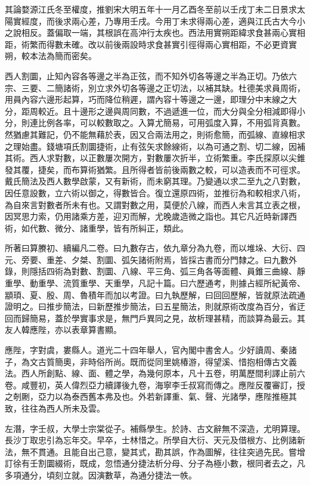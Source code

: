 \begin{pinyinscope}
其論婺源江氏冬至權度，推劉宋大明五年十一月乙酉冬至前以壬戌丁未二日景求太陽實經度，而後求兩心差，乃專用壬戌。今用丁未求得兩心差，適與江氏古大今小之說相反。蓋偏取一端，其根誤在高沖行太疾也。西法用實朔距緯求食甚兩心實相距，術繁而得數未確。改以前後兩設時求食甚實引徑得兩心實相距，不必更資實朔，較本法為簡而密矣。

西人割圜，止知內容各等邊之半為正弦，而不知外切各等邊之半為正切。乃依六宗、三要、二簡諸術，別立求外切各等邊之正切法，以補其缺。杜德美求員周術，用員內容六邊形起算，巧而降位稍遲，謂內容十等邊之一邊，即理分中末線之大分，距周較近。且十邊形之邊與周同數，不過遞進一位，而大分與全分相減即得小分，則連比例各率，可以較數取之。入算尤簡易，可用弧度入算，不用弧背真數。然猶慮其難記，仍不能無藉於表，因又合兩法用之，則術愈簡，而弧線、直線相求之理始盡。錢塘項氏割圜捷術，止有弦矢求餘線術，以為可通之割、切二線，因補其術。西人求對數，以正數屢次開方，對數屢次折半，立術繁重。李氏探原以尖錐發其覆，捷矣，而布算術猶繁。且所得者皆前後兩數之較，可以造表而不可徑求。戴氏簡法及西人數學啟蒙，又有新術，而未窮其理。乃變通以求二至九之八對數，因任意設數，立六術以御之，得數皆合。復立還原四術，並推衍為和較相求八術，為自來言對數者所未有也。又謂對數之用，莫便於八線，而西人未言其立表之根，因冥思力索，仍用諸乘方差，迎刃而解，尤晚歲造微之詣也。其它凡近時新譯西術，如代數、微分、諸重學，皆有所糾正，類此。

所著曰算賸初、續編凡二卷。曰九數存古，依九章分為九卷，而以堆垛、大衍、四元、旁要、重差、夕桀、割圜、弧矢諸術附焉，皆採古書而分門隸之。曰九數外錄，則隱括四術為對數、割圜、八線、平三角、弧三角各等面體、員錐三曲線、靜重學、動重學、流質重學、天重學，凡記十篇。曰六歷通考，則據占經所紀黃帝、顓頊、夏、殷、周、魯積年而加以考證。曰九執歷解，曰回回歷解，皆就原法疏通證明之。曰推步簡法，曰新歷推步簡法，曰五星簡法，則就原術改度為百分，省迂回而歸簡易，蓋於學實事求是，無門戶異同之見，故析理甚精，而談算為最云。其友人韓應陛，亦以表章算書顯。

應陛，字對虞，婁縣人。道光二十四年舉人，官內閣中書舍人。少好讀周、秦諸子，為文古質簡奧，非時俗所尚。既而從同里姚椿游，得望溪、惜抱相傳古文義法。西人所創點、線、面、體之學，為幾何原本，凡十五卷，明萬歷間利譯止前六卷。咸豐初，英人偉烈亞力續譯後九卷，海寧李壬叔寫而傳之。應陛反覆審訂，授之剞劂，亞力以為泰西舊本弗及也。外若新譯重、氣、聲、光諸學，應陛推極其致，往往為西人所未及雲。

左潛，字壬叔，大學士宗棠從子。補縣學生。於詩、古文辭無不深造，尤明算理。長沙丁取忠引為忘年交。早卒，士林惜之。所學自大衍、天元及借根方、比例諸新法，無不貫通。且能自出己意，變其式，勘其誤，作為圖解，往往突過先民。嘗增訂徐有壬割圜綴術，既成，忽悟通分捷法析分母、分子為極小數，根同者去之，凡多項通分，頃刻立就。因演數草，為通分捷法一帙。


\end{pinyinscope}
